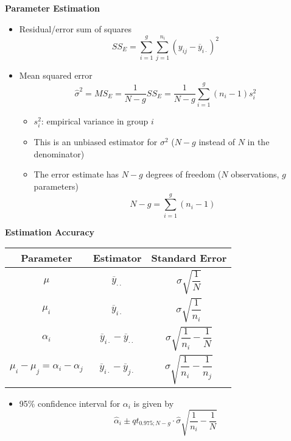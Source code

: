 \documentclass[a4paper]{article}
\begin{document}
\textbf{Parameter Estimation}
\begin{itemize}
    \item Residual/error sum of squares
    \[SS_E=\sum_{i=1}^{g}\sum_{j=1}^{n_i}(y_{ij}-\overline{y}_{i\cdot} )^2 \]
    \item Mean squared error
    \[\hat{\sigma}^2=MS_E=\frac{1}{N-g}SS_E=\frac{1}{N-g}\sum_{i=1}^{g}(n_i-1)s_i^2 \]
    \begin{itemize}
        \item $s_i^2$: empirical variance in group $i$
        \item This is an unbiased estimator for $\sigma^2$ ($N-g$ instead of $N$ in the denominator)
        \item The error estimate has $N-g$ degrees of freedom ($N$ observations, $g$ parameters)
        \[N-g=\sum_{i=1}^g(n_i-1) \]
    \end{itemize}
\end{itemize}


\textbf{Estimation Accuracy}
\begin{table}[!htbp]
    \centering
    \begin{tabular}{c|c|c}
    \textbf{Parameter} & \textbf{Estimator} & \textbf{Standard Error}  \\
    \hline
    $\mu$ & $\overline{y}_{\cdot\cdot}$ & $\sigma\sqrt{\dfrac{1}{N}}$ \\
    \hline
    $\mu_i$ & $\overline{y}_{i\cdot}$ & $\sigma\sqrt{\dfrac{1}{n_i}}$ \\
    \hline 
    $\alpha_i$ & $\overline{y}_{i\cdot}-\overline{y}_{\cdot\cdot}$ & $\sigma\sqrt{\dfrac{1}{n_i}-\dfrac{1}{N}}$ \\
    \hline 
    $\mu_i-\mu_j=\alpha_i-\alpha_j$ & $\overline{y}_{i\cdot}-\overline{y}_{j\cdot}$ & $\sigma\sqrt{\dfrac{1}{n_i}-\dfrac{1}{n_j}}$
    \end{tabular}
\end{table}
\begin{itemize}
    \item 95\% confidence interval for $\alpha_i$ is given by
    \[\hat{\alpha}_i\pm qt_{0.975;N-g}\cdot\hat{\sigma}\sqrt{\frac{1}{n_i}-\frac{1}{N}} \]
\end{itemize}
\end{document}
